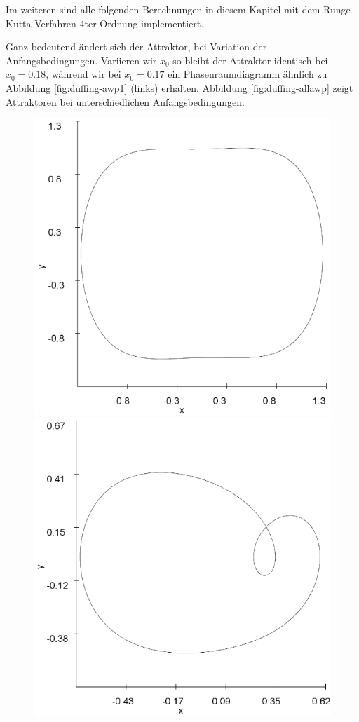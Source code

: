 \documentclass{scrartcl}
\begin{document}
Im weiteren sind alle folgenden Berechnungen in diesem Kapitel mit dem Runge-Kutta-Verfahren 4ter Ordnung implementiert.

Ganz bedeutend ändert sich der Attraktor, bei Variation der Anfangsbedingungen. Variieren wir $x_0$ so bleibt der Attraktor identisch bei $x_0=0.18$, während wir bei $x_0=0.17$ ein Phasenraumdiagramm ähnlich zu Abbildung \ref{fig:duffing-awp1} (links) erhalten.
\newline
Abbildung \ref{fig:duffing-allawp} zeigt Attraktoren bei unterschiedlichen Anfangsbedingungen.
\begin{figure}[!htbp]
\includegraphics[scale=0.4]{duffing-awp2-500k-nach-500k-h0,01-runge}
\includegraphics[scale=0.4]{duffing-awp3-500k-nach-500k-h0,01-runge}

\end{figure}
\end{document}
